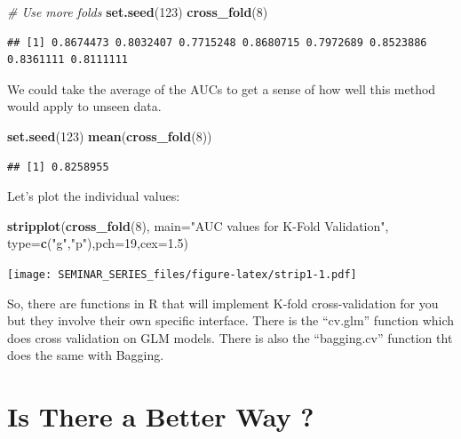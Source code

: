 \documentclass[
]{book}
\newenvironment{Shaded}{\begin{snugshade}}{\end{snugshade}}
\newcommand{\CommentTok}[1]{\textcolor[rgb]{0.56,0.35,0.01}{\textit{#1}}}
\newcommand{\DataTypeTok}[1]{\textcolor[rgb]{0.13,0.29,0.53}{#1}}
\newcommand{\DecValTok}[1]{\textcolor[rgb]{0.00,0.00,0.81}{#1}}
\newcommand{\FloatTok}[1]{\textcolor[rgb]{0.00,0.00,0.81}{#1}}
\newcommand{\KeywordTok}[1]{\textcolor[rgb]{0.13,0.29,0.53}{\textbf{#1}}}
\newcommand{\NormalTok}[1]{#1}
\newcommand{\StringTok}[1]{\textcolor[rgb]{0.31,0.60,0.02}{#1}}
\begin{document}
\begin{Shaded}
\begin{Highlighting}[]
\CommentTok{# Use more folds}
\KeywordTok{set.seed}\NormalTok{(}\DecValTok{123}\NormalTok{)}
\KeywordTok{cross_fold}\NormalTok{(}\DecValTok{8}\NormalTok{)}
\end{Highlighting}
\end{Shaded}

\begin{verbatim}
## [1] 0.8674473 0.8032407 0.7715248 0.8680715 0.7972689 0.8523886 0.8361111 0.8111111
\end{verbatim}

We could take the average of the AUCs to get a sense of how well this method would apply to unseen data.

\begin{Shaded}
\begin{Highlighting}[]
\KeywordTok{set.seed}\NormalTok{(}\DecValTok{123}\NormalTok{)}
\KeywordTok{mean}\NormalTok{(}\KeywordTok{cross_fold}\NormalTok{(}\DecValTok{8}\NormalTok{))}
\end{Highlighting}
\end{Shaded}

\begin{verbatim}
## [1] 0.8258955
\end{verbatim}

Let's plot the individual values:

\begin{Shaded}
\begin{Highlighting}[]
\KeywordTok{stripplot}\NormalTok{(}\KeywordTok{cross_fold}\NormalTok{(}\DecValTok{8}\NormalTok{),}
          \DataTypeTok{main=}\StringTok{"AUC values for K-Fold Validation"}\NormalTok{,}
          \DataTypeTok{type=}\KeywordTok{c}\NormalTok{(}\StringTok{"g"}\NormalTok{,}\StringTok{"p"}\NormalTok{),}\DataTypeTok{pch=}\DecValTok{19}\NormalTok{,}\DataTypeTok{cex=}\FloatTok{1.5}\NormalTok{)}
\end{Highlighting}
\end{Shaded}

\texttt{[image: SEMINAR\_SERIES\_files/figure-latex/strip1-1.pdf]}

So, there are functions in R that will implement K-fold cross-validation for you but they involve their own specific interface. There is the ``cv.glm'' function which does cross validation on GLM models. There is also the ``bagging.cv'' function tht does the same with Bagging.

\hypertarget{is-there-a-better-way}{%
\chapter{Is There a Better Way ?}\label{is-there-a-better-way}}
\end{document}
